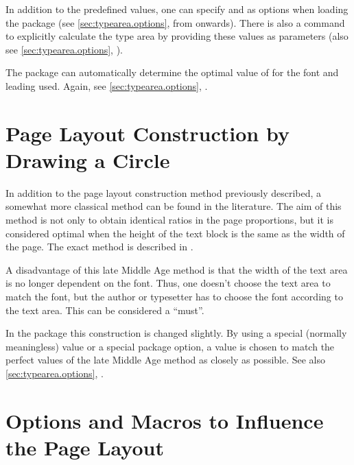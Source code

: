 \begin{Explain}
  In addition to the predefined values, one can specify  and
   as options when loading the package (see
  \autoref{sec:typearea.options}, from
   onwards). There is also a
  command to explicitly calculate the type area by providing these
  values as parameters (also see \autoref{sec:typearea.options},
  ).

  The  package can automatically determine the
  optimal value of  for the font and leading used.
  Again, see \autoref{sec:typearea.options},
  .
\end{Explain}


\section{Page Layout Construction by Drawing a Circle}
\label{sec:typearea.circleConstruction}

\begin{Explain}
  In addition to the page layout construction
  method previously described, a somewhat more classical method can be
  found in the literature. The aim of this method is not only to
  obtain identical ratios in the page proportions, but it is
  considered optimal when the height of the text block is the same as
  the width of the page. The exact method is described in
  \cite{JTsch87}.

  A disadvantage of this late Middle Age method is that the width of
  the text area is no longer dependent on the font. Thus, one doesn't
  choose the text area to match the font, but the author or typesetter
  has to choose the font according to the text area. This can be
  considered a ``must''.

  In the  package this construction is changed
  slightly. By using a special (normally meaningless)  value
  or a special package option, a  value is chosen to match
  the perfect values of the late Middle Age method as closely as
  possible. See also \autoref{sec:typearea.options},
  .
\end{Explain}



\section{Options and Macros to Influence the Page Layout}
\label{sec:typearea.typearea}

